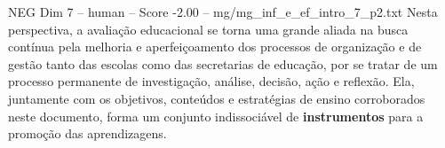 \begin{textsample}{NEG Dim 7 – human – Score -2.00 – mg/mg\_inf\_e\_ef\_intro\_7\_p2.txt}  \label{ex:f7_neg_011}
Nesta perspectiva, a avaliação educacional se torna uma grande aliada na busca contínua pela melhoria e aperfeiçoamento dos processos de organização e de gestão tanto das escolas como das secretarias de educação, por se tratar de um processo permanente de investigação, análise, decisão, ação e reflexão.
Ela, juntamente com os objetivos, conteúdos e estratégias de ensino corroborados neste documento, forma um conjunto indissociável de \textbf{instrumentos} para a promoção das aprendizagens.

\end{textsample}
